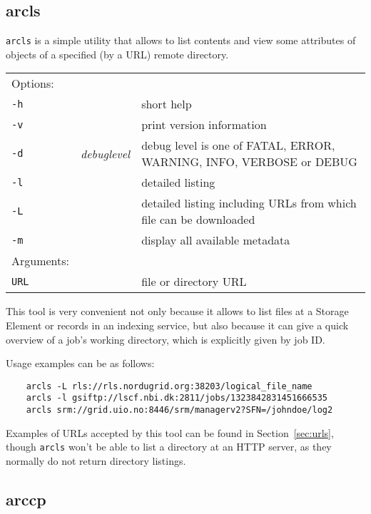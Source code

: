\subsection{arcls}\label{sec:arcls}
\texttt{arcls} is a simple
utility that allows to list contents and view some attributes of
objects of a specified (by a URL) remote directory.

\hspace*{0.5cm}
\begin{shaded}
\end{shaded}
\begin{longtable}{llp{8cm}}
    Options:&&\\
    \texttt{-h} && short help\\
    \texttt{-v} && print version information\\
    \texttt{-d} & \textit{debuglevel} &debug level is one of  FATAL, ERROR, WARNING, INFO, VERBOSE or DEBUG\\
    \texttt{-l} &  & detailed listing\\
    \texttt{-L} &  & detailed listing including URLs from which file can 
    be downloaded\\
    \texttt{-m} && display all available metadata\\
    Arguments:&&\\
    \texttt{URL} && file or directory URL\\
\end{longtable}

This tool is very convenient not only because it allows to list files
at a Storage Element or records in an indexing service, but also
because it can give a quick overview of a job's working directory,
which is explicitly given by job ID.

Usage examples can be as follows:

\begin{verbatim}
    arcls -L rls://rls.nordugrid.org:38203/logical_file_name
    arcls -l gsiftp://lscf.nbi.dk:2811/jobs/1323842831451666535
    arcls srm://grid.uio.no:8446/srm/managerv2?SFN=/johndoe/log2
\end{verbatim}

Examples of URLs accepted by this tool can be found in
Section~\ref{sec:urls}, though \texttt{arcls} won't be able to list a
directory at an HTTP server, as they normally do not return directory
listings.

\subsection{arccp}\label{sec:arccp}

